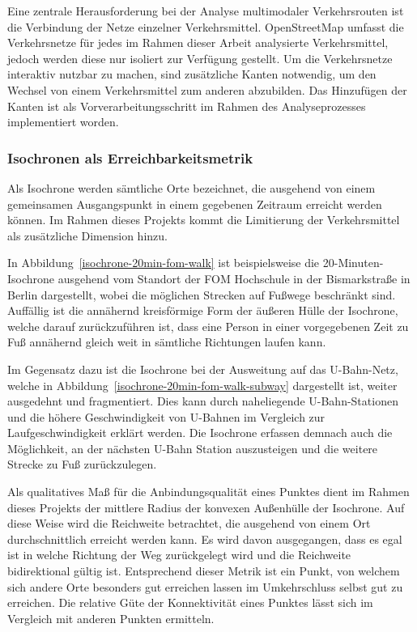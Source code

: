 Eine zentrale Herausforderung bei der Analyse multimodaler Verkehrsrouten ist die Verbindung der Netze einzelner Verkehrsmittel. OpenStreetMap umfasst die Verkehrsnetze für jedes im Rahmen dieser Arbeit analysierte Verkehrsmittel, jedoch werden diese nur isoliert zur Verfügung gestellt. Um die Verkehrsnetze interaktiv nutzbar zu machen, sind zusätzliche Kanten notwendig, um den Wechsel von einem Verkehrsmittel zum anderen abzubilden. Das Hinzufügen der Kanten ist als Vorverarbeitungsschritt im Rahmen des Analyseprozesses implementiert worden.

\subsubsection{Isochronen als Erreichbarkeitsmetrik}
\label{isochronen_als_vergleichbarkeitsmetrik}

Als Isochrone werden sämtliche Orte bezeichnet, die ausgehend von einem gemeinsamen Ausgangspunkt in einem gegebenen Zeitraum erreicht werden können. Im Rahmen dieses Projekts kommt die Limitierung der Verkehrsmittel als zusätzliche Dimension hinzu.

In Abbildung~\ref{isochrone-20min-fom-walk} ist beispielsweise die 20-Minuten-Isochrone ausgehend vom Standort der FOM Hochschule in der Bismarkstraße in Berlin dargestellt, wobei die möglichen Strecken auf Fußwege beschränkt sind. Auffällig ist die annähernd kreisförmige Form der äußeren Hülle der Isochrone, welche darauf zurückzuführen ist, dass eine Person in einer vorgegebenen Zeit zu Fuß annähernd gleich weit in sämtliche Richtungen laufen kann.


Im Gegensatz dazu ist die Isochrone bei der Ausweitung auf das U-Bahn-Netz, welche in Abbildung~\ref{isochrone-20min-fom-walk-subway} dargestellt ist, weiter ausgedehnt und fragmentiert. Dies kann durch naheliegende U-Bahn-Stationen und die höhere Geschwindigkeit von U-Bahnen im Vergleich zur Laufgeschwindigkeit erklärt werden. Die Isochrone erfassen demnach auch die Möglichkeit, an der nächsten U-Bahn Station auszusteigen und die weitere Strecke zu Fuß zurückzulegen.


Als qualitatives Maß für die Anbindungsqualität eines Punktes dient im Rahmen dieses Projekts der mittlere Radius der konvexen Außenhülle der Isochrone. Auf diese Weise wird die Reichweite betrachtet, die ausgehend von einem Ort durchschnittlich erreicht werden kann. Es wird davon ausgegangen, dass es egal ist in welche Richtung der Weg zurückgelegt wird und die Reichweite bidirektional gültig ist. Entsprechend dieser Metrik ist ein Punkt, von welchem sich andere Orte besonders gut erreichen lassen im Umkehrschluss selbst gut zu erreichen. Die relative Güte der Konnektivität eines Punktes lässt sich im Vergleich mit anderen Punkten ermitteln.

